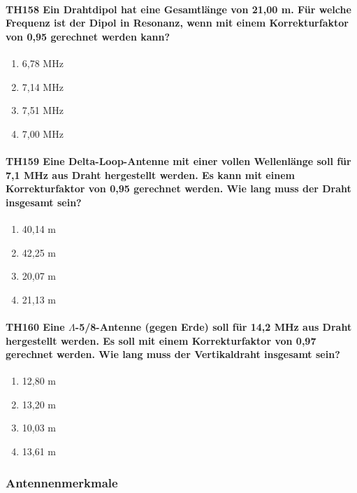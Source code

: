 \documentclass[8pt]{article}
\begin{document}
\paragraph*{TH158 Ein Drahtdipol hat eine Gesamtlänge von 21,00 m. Für welche Frequenz ist der Dipol in Resonanz, wenn mit einem Korrekturfaktor von 0,95 gerechnet werden kann?} 
\begin{enumerate}[nolistsep,label=\Alph*]
\item 6,78 MHz
\item 7,14 MHz
\item 7,51 MHz
\item 7,00 MHz
\end{enumerate}

\paragraph*{TH159 Eine Delta-Loop-Antenne mit einer vollen Wellenlänge soll für 7,1 MHz aus Draht hergestellt werden. Es kann mit einem Korrekturfaktor von 0,95 gerechnet werden. Wie lang muss der Draht insgesamt sein?}
\begin{enumerate}[nolistsep,label=\Alph*]
\item 40,14 m
\item 42,25 m
\item 20,07 m
\item 21,13 m
\end{enumerate}

\paragraph*{TH160 Eine $\Lambda$-5/8-Antenne (gegen Erde) soll für 14,2 MHz aus Draht hergestellt werden. Es soll mit einem Korrekturfaktor von 0,97 gerechnet werden. Wie lang muss der Vertikaldraht insgesamt sein?}
\begin{enumerate}[nolistsep,label=\Alph*]
\item 12,80 m
\item 13,20 m
\item 10,03 m
\item 13,61 m
\end{enumerate}

\pagebreak
\subsubsection{Antennenmerkmale}
\end{document}
